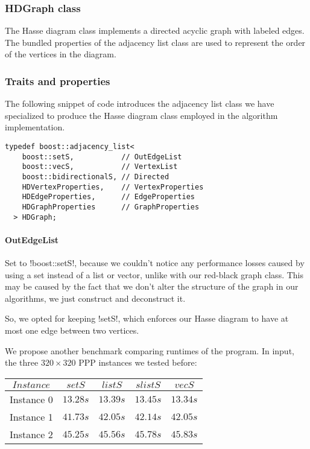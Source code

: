 \pagebreak

\subsubsection{HDGraph class}\label{section:hdgraph-class}

The Hasse diagram class implements a directed acyclic graph with labeled edges.
The bundled properties of the adjacency list class are used to represent the order of the vertices in the diagram.

\subsubsection*{Traits and properties}

The following snippet of code introduces the adjacency list class we have specialized to produce the Hasse diagram class employed in the algorithm implementation.

\begin{lstlisting}[belowskip=0pt]
  typedef boost::adjacency_list<
    boost::setS,           // OutEdgeList
    boost::vecS,           // VertexList
    boost::bidirectionalS, // Directed
    HDVertexProperties,    // VertexProperties
    HDEdgeProperties,      // EdgeProperties
    HDGraphProperties      // GraphProperties
  > HDGraph;
\end{lstlisting}

\paragraph{OutEdgeList}

Set to !boost::setS!, because we couldn't notice any performance losses caused by using a set instead of a list or vector, unlike with our red-black graph class.
This may be caused by the fact that we don't alter the structure of the graph in our algorithms, we just construct and deconstruct it.

So, we opted for keeping !setS!, which enforces our Hasse diagram to have at most one edge between two vertices.

We propose another benchmark comparing runtimes of the program.
In input, the three $320 \times 320$ PPP instances we tested before:

\begin{center}
  \begin{tabular}{c | c c c c}
    $Instance$ & $setS$   & $listS$  & $slistS$ & $vecS$ \\
    \hline
    Instance 0 & $13.28s$ & $13.39s$ & $13.45s$ & $13.34s$ \\
    Instance 1 & $41.73s$ & $42.05s$ & $42.14s$ & $42.05s$ \\
    Instance 2 & $45.25s$ & $45.56s$ & $45.78s$ & $45.83s$
  \end{tabular}
\end{center}

